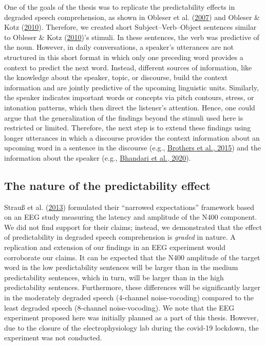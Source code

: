 \documentclass[a4paper, nobind]{templates/ociamthesis}
\begin{document}
One of the goals of the thesis was to replicate the predictability effects in degraded speech comprehension, as shown in Obleser et al. (\protect\hyperlink{ref-Obleser2007}{2007}) and Obleser \& Kotz (\protect\hyperlink{ref-Obleser2010}{2010}).
Therefore, we created short Subject--Verb--Object sentences similar to Obleser \& Kotz (\protect\hyperlink{ref-Obleser2010}{2010})'s stimuli.
In these sentences, the verb was predictive of the noun.
However, in daily conversations, a speaker's utterances are not structured in this short format in which only one preceding word provides a context to predict the next word.
Instead, different sources of information, like the knowledge about the speaker, topic, or discourse, build the context information and are jointly predictive of the upcoming linguistic units.
Similarly, the speaker indicates important words or concepts via pitch contours, stress, or intonation patterns,
which then direct the listener's attention.
Hence, one could argue that the generalization of the findings beyond the stimuli used here is restricted or limited.
Therefore, the next step is to extend these findings using longer utterances in which a discourse provides the context information about an upcoming word in a sentence in the discourse (e.g., \protect\hyperlink{ref-Brothers2015}{Brothers et al., 2015})
and the information about the speaker (e.g., \protect\hyperlink{ref-Bhandari2020}{Bhandari et al., 2020}).

\hypertarget{the-nature-of-the-predictability-effect}{%
\subsection{The nature of the predictability effect}\label{the-nature-of-the-predictability-effect}}

Strauß et al. (\protect\hyperlink{ref-Strauss2013}{2013}) formulated their ``narrowed expectations'' framework based on an EEG study measuring the latency and amplitude of the N400 component.
We did not find support for their claims;
instead, we demonstrated that the effect of predictability in degraded speech comprehension is \emph{graded} in nature.
A replication and extension of our findings in an EEG experiment would corroborate our claims.
It can be expected that the N400 amplitude of the target word in the low predictability sentences will be larger than in the medium predictability sentences, which in turn, will be larger than in the high predictability sentences.
Furthermore, these differences will be significantly larger in the moderately degraded speech (4-channel noise-vocoding) compared to the least degraded speech (8-channel noise-vocoding).
We note that the EEG experiment proposed here was initially planned as a part of this thesis.
However, due to the closure of the electrophysiology lab during the covid-19 lockdown, the experiment was not conducted.
\end{document}
